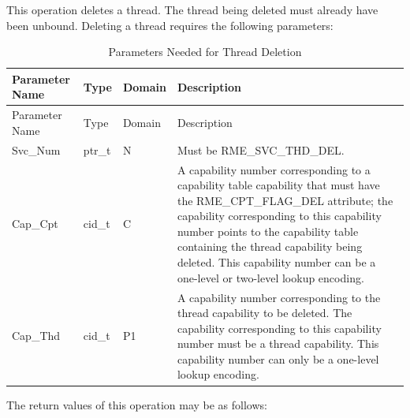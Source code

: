 This operation deletes a thread. The thread being deleted must already have been unbound. Deleting a thread requires the following parameters:

\begin{xltabular}{\textwidth}{@{}>{\hsize\raggedright\arraybackslash}X>{\hsize\raggedright\arraybackslash}X>{\hsize\raggedright\arraybackslash}X>{\hsize\raggedright\arraybackslash}X@{}}
\caption{Parameters Needed for Thread Deletion}\label{tab:4-22-delete-thread-parameters}\\
\toprule
Parameter Name & Type & Domain & Description\tabularnewline
\endfirsthead
\toprule
Parameter Name & Type & Domain & Description\tabularnewline
\midrule
\endhead
Svc\_Num & ptr\_t & N & Must be RME\_SVC\_THD\_DEL.\tabularnewline
Cap\_Cpt & cid\_t & C &
A capability number corresponding to a capability table capability that must have the RME\_CPT\_FLAG\_DEL attribute; the capability corresponding to this capability number points to the capability table containing the thread capability being deleted. This capability number can be a one-level or two-level lookup encoding.\tabularnewline
Cap\_Thd & cid\_t & P1 &
A capability number corresponding to the thread capability to be deleted. The capability corresponding to this capability number must be a thread capability. This capability number can only be a one-level lookup encoding.\tabularnewline
\end{xltabular}
\nopagebreak[4]

The return values of this operation may be as follows:

